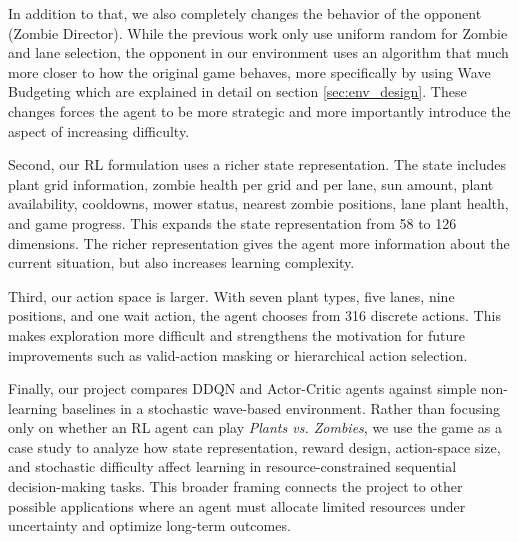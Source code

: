 \documentclass[conference,onecolumn]{IEEEtran}
\begin{document}
In addition to that, we also completely changes the behavior of the opponent (Zombie Director). While the previous work only use uniform random for Zombie and lane selection, the opponent in our environment uses an algorithm that much more closer to how the original game behaves, more specifically by using Wave Budgeting which are explained in detail on section \ref{sec:env_design}. These changes forces the agent to be more strategic and more importantly introduce the aspect of increasing difficulty.

Second, our RL formulation uses a richer state representation. The state includes plant grid information, zombie health per grid and per lane, sun amount, plant availability, cooldowns, mower status, nearest zombie positions, lane plant health, and game progress. This expands the state representation from 58 to 126 dimensions. The richer representation gives the agent more information about the current situation, but also increases learning complexity.

Third, our action space is larger. With seven plant types, five lanes, nine positions, and one wait action, the agent chooses from 316 discrete actions. This makes exploration more difficult and strengthens the motivation for future improvements such as valid-action masking or hierarchical action selection.

Finally, our project compares DDQN and Actor-Critic agents against simple non-learning baselines in a stochastic wave-based environment. Rather than focusing only on whether an RL agent can play \textit{Plants vs. Zombies}, we use the game as a case study to analyze how state representation, reward design, action-space size, and stochastic difficulty affect learning in resource-constrained sequential decision-making tasks. This broader framing connects the project to other possible applications where an agent must allocate limited resources under uncertainty and optimize long-term outcomes.



\end{document}
